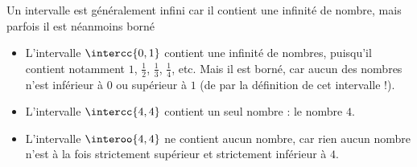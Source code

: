 \documentclass[french,xcolor=svgnames]{beamer}
\begin{document}
\begin{frame}
  Un intervalle est généralement \og infini\fg{} car il contient une infinité de nombre,\pause{} mais parfois il est néanmoins \og borné\fg{}

  \begin{example}
    \begin{itemize}
    \item L'intervalle \(\intercc{0,1}\) contient une infinité de nombres,\pause{} puisqu'il contient notamment \(1\), \(\frac{1}{2}\), \(\frac{1}{3}\), \(\frac{1}{4}\), etc.\pause{} Mais il est borné, car aucun des nombres n'est inférieur à \(0\) ou supérieur à \(1\)\pause{} (de par la définition de cet intervalle !).\pause{}
    \item L'intervalle \(\intercc{4,4}\) contient un seul nombre\pause{} : le nombre \(4\).\pause{}
    \item L'intervalle \(\interoo{4,4}\) ne contient aucun nombre\pause{}, car rien aucun nombre n'est à la fois strictement supérieur et strictement inférieur à \(4\).\pause{}
    \end{itemize}
  \end{example}
\end{frame}
\end{document}
